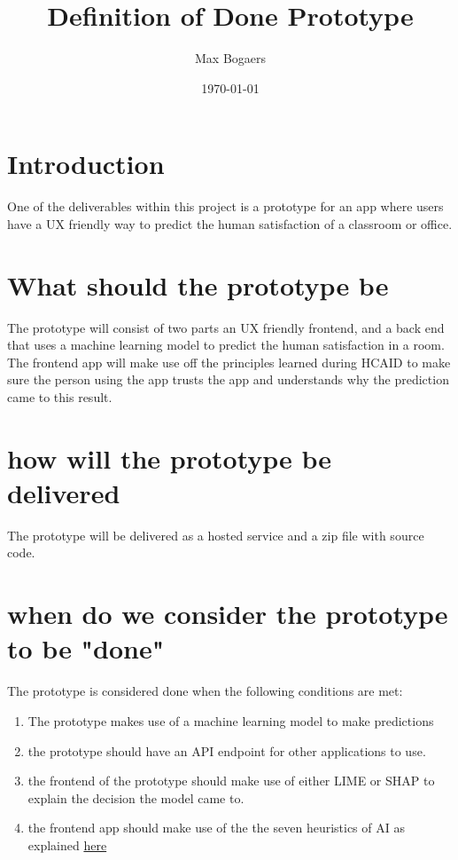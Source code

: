 \documentclass[12pt, a4paper]{article}
\title{Definition of Done Prototype}
\author{Max Bogaers}
\date{\today}
\begin{document}
	\maketitle
	\newpage
	\section{Introduction}
	One of the deliverables within this project is a prototype for an app where users have a UX friendly way to predict the human satisfaction of a classroom or office. 
	
	\section{What should the prototype be}
	The prototype will consist of two parts an UX friendly frontend, and a back end  that uses a machine learning model to predict the human satisfaction in a room. The frontend app will make use off the principles learned during HCAID to make sure the person using the app trusts the app and understands why the prediction came to this result. 
	
	
	\section{how will the prototype be delivered}
	The prototype will be delivered as a hosted service and a zip file with source code.
	
	\section{when do we consider the prototype to be "done"}
	The prototype is considered done when the following conditions are met:
	\begin{enumerate}
		\item The prototype makes use of a machine learning model to make predictions
		\item the prototype should have an API endpoint for other applications to use.
		\item the frontend of the prototype should make use of either LIME or SHAP to explain the decision the model came to. 
		\item the frontend app should make use of the the seven heuristics of AI as explained \href{https://brightspace.avans.nl/d2l/le/lessons/36627/topics/304705}{here}
		
	\end{enumerate}
	
\end{document}
